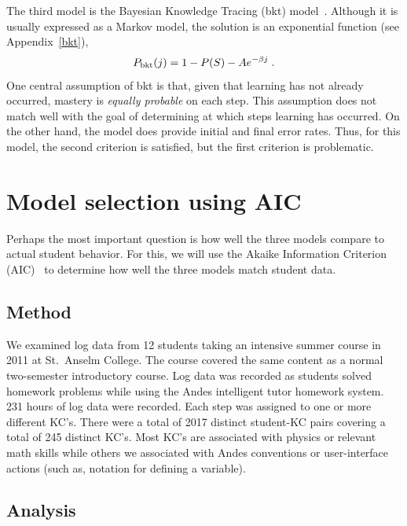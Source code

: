 \documentclass[11pt,letterpaper]{article}
\begin{document}
The third model is the Bayesian Knowledge Tracing (bkt) model~\cite{anderson}.
Although it is usually expressed as a Markov model, the solution
is an exponential function (see Appendix~\ref{bkt}),
%
\begin{equation}
         P_{\rm bkt}(j) = 1-P(S) -A e^{-\beta j} \; .
\end{equation}
%
One central assumption of bkt is that, given that learning
has not already occurred, mastery is {\em equally probable} on each step.
This assumption does not match well with the goal of
determining at which steps learning has occurred.
On the other hand, the model does provide initial and final
error rates.  Thus, for this model, the second criterion is 
satisfied, but the first criterion is problematic.

\section{Model selection using AIC}
\label{model-selection}

Perhaps the most important question is how well the three
models compare to actual student behavior.  For this, we
will use the Akaike Information Criterion (AIC)~\cite{akaike,aicbook}
to determine how well the three models match student data.

\subsection{Method}

We examined log data from 12 students taking an intensive
summer course in 2011 at St.\ Anselm College.  The course
covered the same content as a normal two-semester introductory
course.  Log data was recorded as students solved homework 
problems while using the Andes intelligent tutor homework system.
231 hours of log data were recorded.
Each step was assigned to one or more different KC's.  
There were a total of 2017 distinct
student-KC pairs covering a total of 245 distinct KC's.
Most KC's are associated with physics
or relevant math skills while others we associated with 
Andes conventions or user-interface actions (such as, notation
for defining a variable). 

\subsection{Analysis}
\end{document}
